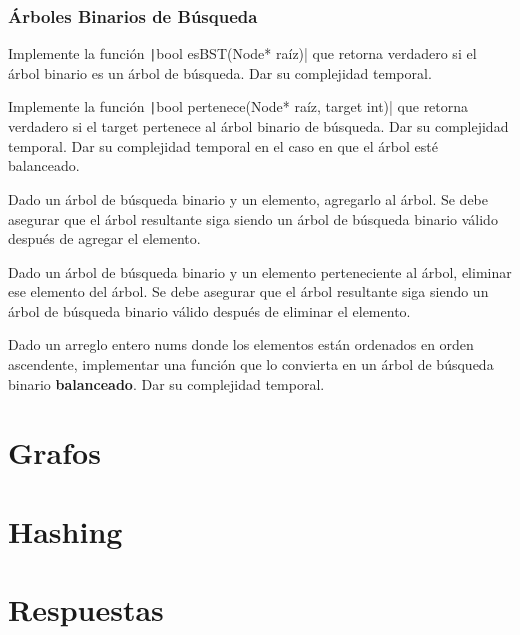 \documentclass[titlepage,oneside]{book}
\begin{document}
\subsection{Árboles Binarios de Búsqueda}

\begin{Exercise}
   Implemente la función \texttt|bool esBST(Node* raíz)| que retorna verdadero si el árbol binario es un árbol de búsqueda. Dar su complejidad temporal.
\end{Exercise}

\begin{Exercise}
   Implemente la función \texttt|bool pertenece(Node* raíz, target int)| que retorna verdadero si el target pertenece al árbol binario de búsqueda.
   	\Question Dar su complejidad temporal.
	\Question Dar su complejidad temporal en el caso en que el árbol esté balanceado.
\end{Exercise}

\begin{Exercise}
   Dado un árbol de búsqueda binario y un elemento, agregarlo al árbol. Se debe asegurar que el árbol resultante siga siendo un árbol de búsqueda binario válido después de agregar el elemento.
\end{Exercise}

\begin{Exercise}
   Dado un árbol de búsqueda binario y un elemento perteneciente al árbol, eliminar ese elemento del árbol. Se debe asegurar que el árbol resultante siga siendo un árbol de búsqueda binario válido después de eliminar el elemento.
\end{Exercise}

\begin{Exercise}
   Dado un arreglo entero nums donde los elementos están ordenados en orden ascendente, implementar una función que lo convierta en un árbol de búsqueda binario \textbf{balanceado}. Dar su complejidad temporal.
\end{Exercise}



\chapter{Grafos}

\chapter{Hashing}

\chapter{Respuestas}
\shipoutAnswer

\end{document}
